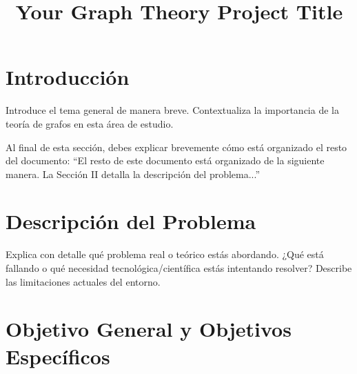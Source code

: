 \documentclass[conference]{IEEEtran}
\begin{document}
\title{Your Graph Theory Project Title}

\author{
}

\maketitle


\section{Introducción}
Introduce el tema general de manera breve. Contextualiza la importancia de la teoría de grafos en esta área de estudio.

Al final de esta sección, debes explicar brevemente cómo está organizado el resto del documento: ``El resto de este documento está organizado de la siguiente manera. La Sección II detalla la descripción del problema...''

\section{Descripción del Problema}
Explica con detalle qué problema real o teórico estás abordando. ¿Qué está fallando o qué necesidad tecnológica/científica estás intentando resolver? Describe las limitaciones actuales del entorno.

\section{Objetivo General y Objetivos Específicos}
\end{document}
